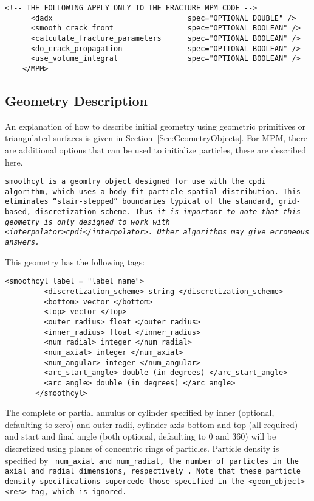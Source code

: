 \begin{Verbatim}[fontsize=\footnotesize]
      <!-- THE FOLLOWING APPLY ONLY TO THE FRACTURE MPM CODE -->
      <dadx                               spec="OPTIONAL DOUBLE" />
      <smooth_crack_front                 spec="OPTIONAL BOOLEAN" />
      <calculate_fracture_parameters      spec="OPTIONAL BOOLEAN" />
      <do_crack_propagation               spec="OPTIONAL BOOLEAN" />
      <use_volume_integral                spec="OPTIONAL BOOLEAN" />
    </MPM>
\end{Verbatim}

\subsection{Geometry Description} \label{Sec:geom_desc}

An explanation of how to describe initial geometry using geometric
primitives or triangulated surfaces is given in
Section~\ref{Sec:GeometryObjects}.  For MPM, there are additional options
that can be used to initialize particles, these are described here.

\tt smoothcyl \normalfont is a geomtry object designed for use with
the cpdi algorithm, which uses a body fit particle spatial
distribution.  This eliminates ``stair-stepped'' boundaries typical of
the standard, grid-based, discretization scheme.  Thus {\it it is
  important to note that this geometry is only designed to work with
  \tt <interpolator>cpdi</interpolator>\normalfont. \it Other
  algorithms may give erroneous answers.}

This geometry has the following tags:

\begin{Verbatim}[fontsize=\footnotesize]
	   <smoothcyl label = "label name">
	     <discretization_scheme> string </discretization_scheme>
	     <bottom> vector </bottom>
	     <top> vector </top>
	     <outer_radius> float </outer_radius>
	     <inner_radius> float </inner_radius>
	     <num_radial> integer </num_radial>
	     <num_axial> integer </num_axial>
	     <num_angular> integer </num_angular>
	     <arc_start_angle> double (in degrees) </arc_start_angle>
	     <arc_angle> double (in degrees) </arc_angle>
	   </smoothcyl>
\end{Verbatim}

The complete or partial annulus or cylinder specified by inner
(optional, defaulting to zero) and outer radii, cylinder axis bottom
and top (all required) and start and final angle (both optional,
defaulting to 0 and 360) will be discretized using planes of
concentric rings of particles.  Particle density is specified by \tt
num\_axial \normalfont and \tt num\_radial\normalfont, the number of
particles in the axial and radial dimensions, respectively
\normalfont.  Note that these particle density specifications
supercede those specified in the \tt <geom\_object> <res> \normalfont
tag, which is ignored.

